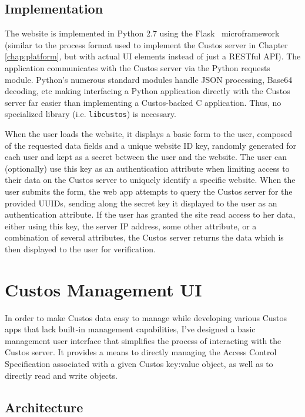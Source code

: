 \subsection{Implementation}

The website is implemented in Python 2.7 using the
Flask~\cite{python-flask} microframework (similar to the process
format used to implement the Custos server in Chapter
\ref{chap:platform}, but with actual UI elements instead of just a
RESTful API). The application communicates with the Custos server via
the Python requests~\cite{python-requests} module. Python's numerous
standard modules handle JSON processing, Base64 decoding, etc making
interfacing a Python application directly with the Custos server far
easier than implementing a Custos-backed C application. Thus, no
specialized library (i.e. \texttt{libcustos}) is necessary.

When the user loads the website, it displays a basic form to the user,
composed of the requested data fields and a unique website ID key,
randomly generated for each user and kept as a secret between the user
and the website. The user can (optionally) use this key as an
authentication attribute when limiting access to their data on the
Custos server to uniquely identify a specific website. When the user
submits the form, the web app attempts to query the Custos server for
the provided UUIDs, sending along the secret key it displayed to the
user as an authentication attribute. If the user has granted the site
read access to her data, either using this key, the server IP address,
some other attribute, or a combination of several attributes, the
Custos server returns the data which is then displayed to the user for
verification.

\section{Custos Management UI}

In order to make Custos data easy to manage while developing various
Custos apps that lack built-in management capabilities, I've designed
a basic management user interface that simplifies the process of
interacting with the Custos server. It provides a means to directly
managing the Access Control Specification associated with a given
Custos key:value object, as well as to directly read and write
objects.

\subsection{Architecture}

